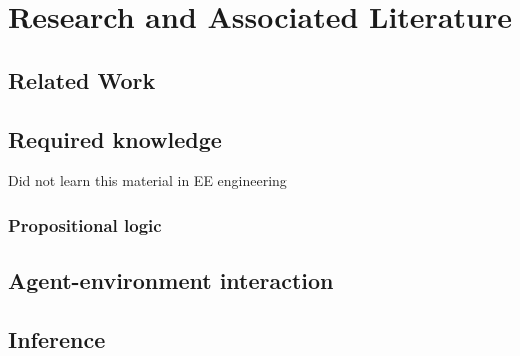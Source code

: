 \chapter{Research and Associated Literature} 
\label{chapter:Lit}

\section{Related Work}



\section{Required knowledge}

Did not learn this material in EE engineering

\subsection{Propositional logic}

\section{Agent-environment interaction}

\section{Inference}